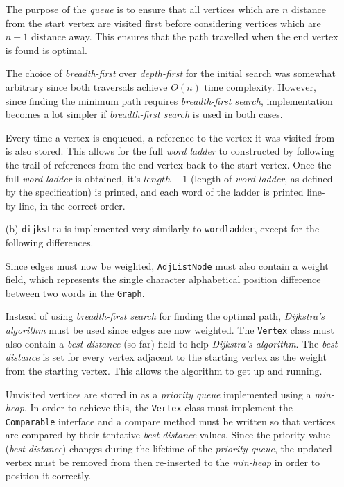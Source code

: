 \documentclass{article}
\begin{document}
\begin{itemize}
    The purpose of the \textit{queue} is to ensure that all vertices which are $n$ distance from the start vertex are visited first before considering vertices which are $n + 1$ distance away. This ensures that the path travelled when the end vertex is found is optimal.

    The choice of \textit{breadth-first} over \textit{depth-first} for the initial search was somewhat arbitrary since both traversals achieve $O(n)$ time complexity. However, since finding the minimum path requires \textit{breadth-first search}, implementation becomes a lot simpler if \textit{breadth-first search} is used in both cases.

    Every time a vertex is enqueued, a reference to the vertex it was visited from is also stored. This allows for the full \textit{word ladder} to constructed by following the trail of references from the end vertex back to the start vertex. Once the full \textit{word ladder} is obtained, it's $length - 1$ (length of \textit{word ladder}, as defined by the specification) is printed, and each word of the ladder is printed line-by-line, in the correct order.

    \item[(b)]
    \texttt{dijkstra} is implemented very similarly to \texttt{wordladder}, except for the following differences.

    Since edges must now be weighted, \texttt{AdjListNode} must also contain a weight field, which represents the single character alphabetical position difference between two words in the \texttt{Graph}.

    Instead of using \textit{breadth-first search} for finding the optimal path, \textit{Dijkstra's algorithm} must be used since edges are now weighted. The \texttt{Vertex} class must also contain a \textit{best distance} (so far) field to help \textit{Dijkstra's algorithm}. The \textit{best distance} is set for every vertex adjacent to the starting vertex as the weight from the starting vertex. This allows the algorithm to get up and running.

    Unvisited vertices are stored in as a \textit{priority queue} implemented using a \textit{min-heap}. In order to achieve this, the \texttt{Vertex} class must implement the \texttt{Comparable} interface and a compare method must be written so that vertices are compared by their tentative \textit{best distance} values. Since the priority value (\textit{best distance}) changes during the lifetime of the \textit{priority queue}, the updated vertex must be removed from then re-inserted to the \textit{min-heap} in order to position it correctly.


\end{itemize}
\end{document}
